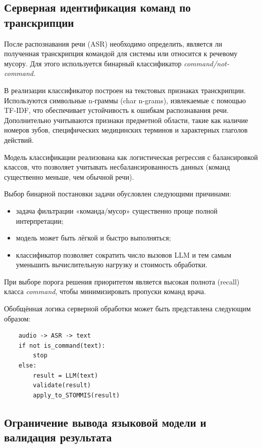 \subsection{Серверная идентификация команд по транскрипции}
\label{subsec:text_classifier}

После распознавания речи (ASR) необходимо определить, является ли полученная транскрипция командой для системы или относится к речевому мусору.
Для этого используется бинарный классификатор \textit{command/not-command}.

В реализации классификатор построен на текстовых признаках транскрипции.
Используются символьные n-граммы (char n-grams), извлекаемые с помощью TF-IDF, что обеспечивает устойчивость к ошибкам распознавания речи.
Дополнительно учитываются признаки предметной области, такие как наличие номеров зубов, специфических медицинских терминов и характерных глаголов действий.

Модель классификации реализована как логистическая регрессия с балансировкой классов, что позволяет учитывать несбалансированность данных (команд существенно меньше, чем обычной речи).

Выбор бинарной постановки задачи обусловлен следующими причинами:
\begin{itemize}
    \item задача фильтрации «команда/мусор» существенно проще полной интерпретации;
    \item модель может быть лёгкой и быстро выполняться;
    \item классификатор позволяет сократить число вызовов LLM и тем самым уменьшить вычислительную нагрузку и стоимость обработки.
\end{itemize}

При выборе порога решения приоритетом является высокая полнота (recall) класса \textit{command}, чтобы минимизировать пропуски команд врача.

Обобщённая логика серверной обработки может быть представлена следующим образом:
\begin{verbatim}
    audio -> ASR -> text
    if not is_command(text):
        stop
    else:
        result = LLM(text)
        validate(result)
        apply_to_STOMMIS(result)
\end{verbatim}

\subsection{Ограничение вывода языковой модели и валидация результата}
\label{subsec:llm_constraints}

